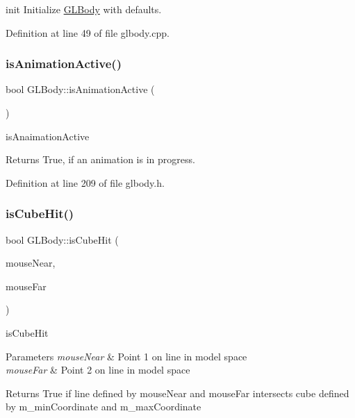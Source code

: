 init Initialize \mbox{\hyperlink{class_g_l_body}{G\+L\+Body}} with defaults. 



Definition at line 49 of file glbody.\+cpp.

\mbox{\label{class_g_l_body_a78e66df2ed6e8277d3363054b0ad0f2e}} 
\subsubsection{\texorpdfstring{isAnimationActive()}{isAnimationActive()}}
{\footnotesize\ttfamily bool G\+L\+Body\+::is\+Animation\+Active (\begin{DoxyParamCaption}{ }\end{DoxyParamCaption})\hspace{0.3cm}{\ttfamily [inline]}}



is\+Anaimation\+Active 

\begin{DoxyReturn}{Returns}
True, if an animation is in progress. 
\end{DoxyReturn}


Definition at line 209 of file glbody.\+h.

\mbox{\label{class_g_l_body_a565ad6592f00bd28942408a1a8ecd669}} 
\subsubsection{\texorpdfstring{isCubeHit()}{isCubeHit()}}
{\footnotesize\ttfamily bool G\+L\+Body\+::is\+Cube\+Hit (\begin{DoxyParamCaption}\item[{Q\+Vector3D}]{mouse\+Near,  }\item[{Q\+Vector3D}]{mouse\+Far }\end{DoxyParamCaption})\hspace{0.3cm}{\ttfamily [virtual]}}



is\+Cube\+Hit 


\begin{DoxyParams}{Parameters}
{\em mouse\+Near} & Point 1 on line in model space \\
\hline
{\em mouse\+Far} & Point 2 on line in model space \\
\hline
\end{DoxyParams}
\begin{DoxyReturn}{Returns}
True if line defined by mouse\+Near and mouse\+Far intersects cube defined by m\+\_\+min\+Coordinate and m\+\_\+max\+Coordinate 
\end{DoxyReturn}


